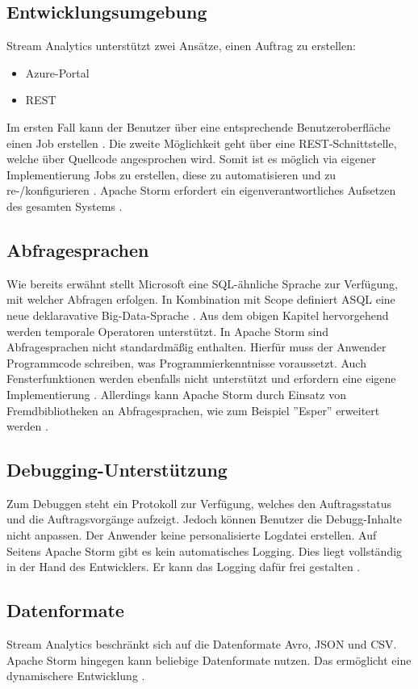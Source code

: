 \subsection{Entwicklungsumgebung}
Stream Analytics unterstützt zwei Ansätze, einen Auftrag zu erstellen: 
\begin{itemize} 
	\item Azure-Portal
	\item REST
\end{itemize}
Im ersten Fall kann der Benutzer über eine entsprechende Benutzeroberfläche einen Job erstellen \cite{jeffstokes72.19.12.2017}. Die zweite Möglichkeit geht über eine REST-Schnittstelle, welche über Quellcode angesprochen wird. Somit ist es möglich via eigener Implementierung Jobs zu erstellen, diese zu automatisieren und zu re-/konfigurieren \cite{samacha.19.12.2017}. Apache Storm erfordert ein eigenverantwortliches Aufsetzen des gesamten Systems \cite{apache.2017}. 

\subsection{Abfragesprachen} \label{absprache}
Wie bereits erwähnt stellt Microsoft eine SQL-ähnliche Sprache zur Verfügung, mit welcher Abfragen erfolgen. In Kombination mit Scope definiert ASQL eine neue deklaravative Big-Data-Sprache \cite{sql.2016}. Aus dem obigen Kapitel hervorgehend werden temporale Operatoren unterstützt. In Apache Storm sind Abfragesprachen nicht standardmäßig enthalten. Hierfür muss der Anwender Programmcode schreiben, was Programmierkenntnisse voraussetzt. Auch Fensterfunktionen werden ebenfalls nicht unterstützt und erfordern eine eigene Implementierung \cite{samacha.2017}. Allerdings kann Apache Storm durch Einsatz von Fremdbibliotheken an Abfragesprachen, wie zum Beispiel ''Esper'' erweitert werden \cite{esper.2016}.

\subsection{Debugging-Unterstützung} \label{Debugging}
Zum Debuggen steht ein Protokoll zur Verfügung, welches den Auftragsstatus und die Auftragsvorgänge aufzeigt. Jedoch können Benutzer die Debugg-Inhalte nicht anpassen. Der Anwender keine personalisierte Logdatei erstellen. Auf Seitens Apache Storm gibt es kein automatisches Logging. Dies liegt vollständig in der Hand des Entwicklers. Er kann das Logging dafür frei gestalten \cite{apachedebugging.2106}.

\subsection{Datenformate}
Stream Analytics beschränkt sich auf die Datenformate Avro, JSON und CSV. Apache Storm hingegen kann beliebige Datenformate nutzen. Das ermöglicht eine dynamischere Entwicklung \cite{Klein.2017}. 


